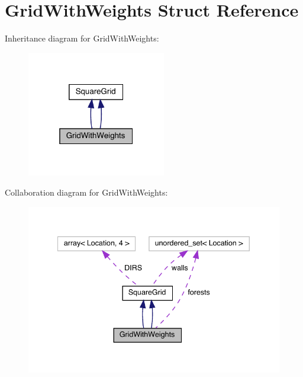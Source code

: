 \hypertarget{struct_grid_with_weights}{}\section{Grid\+With\+Weights Struct Reference}
\label{struct_grid_with_weights}


Inheritance diagram for Grid\+With\+Weights\+:\nopagebreak
\begin{figure}[H]
\begin{center}
\leavevmode
\includegraphics[width=172pt]{struct_grid_with_weights__inherit__graph}
\end{center}
\end{figure}


Collaboration diagram for Grid\+With\+Weights\+:\nopagebreak
\begin{figure}[H]
\begin{center}
\leavevmode
\includegraphics[width=340pt]{struct_grid_with_weights__coll__graph}
\end{center}
\end{figure}
